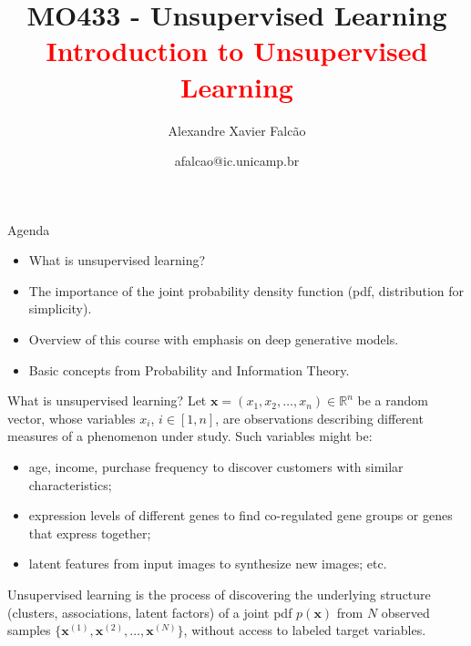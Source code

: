 \documentclass{beamer}
\title[MO433 - Unsupervised Learning]{MO433 - Unsupervised Learning \\ \textcolor{red}{Introduction to Unsupervised Learning}}
\author{Alexandre Xavier Falc{\~{a}}o}
\institute[IC-UNICAMP]{Institute of Computing - UNICAMP}
\date{afalcao@ic.unicamp.br}
\begin{document}
\begin{frame}
\titlepage
\end{frame}

\begin{frame}{Agenda}

\begin{itemize}
\item What is unsupervised learning?
\vspace{0.5cm}
\item The importance of the joint \alert{probability density function} (pdf, distribution for simplicity).
\vspace{0.5cm}
\item Overview of this course with emphasis on deep generative models.
\vspace{0.5cm}
\item Basic concepts from Probability and Information Theory. 
\end{itemize}

\end{frame}

\begin{frame}{What is unsupervised learning?}
Let $\mathbf{x}=(x_1,x_2,\ldots,x_n)\in \mathbb{R}^n$ be a random
vector, whose variables $x_i$, $i\in [1,n]$, are observations
describing different measures of a phenomenon under study.
\pause \vspace{0.5cm} Such variables might be:
\begin{itemize}
  \item age, income, purchase frequency to discover customers with
    similar characteristics;
    \vspace{0.3cm}
  \item expression levels of different genes to find co-regulated gene
    groups or genes that express together;
    \vspace{0.3cm}
  \item latent features from input images to synthesize new images; etc.
\end{itemize}

\pause \vspace{0.5cm} \alert{Unsupervised learning} is the process of
discovering the underlying structure (clusters, associations, latent
factors) of a joint pdf $p(\mathbf{x})$ from $N$
observed samples
$\{\mathbf{x}^{(1)},\mathbf{x}^{(2)},\ldots,\mathbf{x}^{(N)}\}$,
without access to labeled target variables.
\end{frame}
\end{document}
